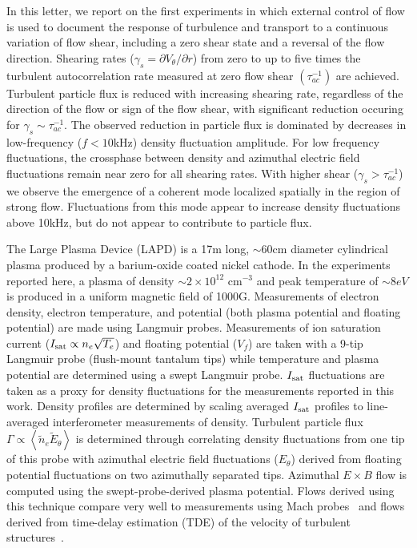 \documentclass[aps,prl,amsmath,amssymb,reprint,superscriptaddress]{revtex4-1} %
\begin{document}
In this letter, we report on the first experiments in which external control of flow is used to document the response of turbulence and transport to a continuous variation of flow shear, including a zero shear state and a reversal of the flow direction. Shearing rates ($\gamma_{s}= \partial V_{\theta}/\partial r$) from
zero to up to five times the turbulent autocorrelation rate measured at zero flow shear $(\tau_{ac}^{-1})$ are achieved. Turbulent particle flux is reduced with increasing shearing rate, regardless of the direction of the flow or sign of the flow shear, with significant reduction occuring for $\gamma_{s} \sim \tau_{ac}^{-1}$.  The observed reduction in particle flux is dominated by decreases in low-frequency ($f < 10$kHz) density fluctuation amplitude. For low frequency fluctuations, the crossphase between density and azimuthal electric field fluctuations remain near zero for all shearing rates.  With higher shear ($\gamma_{s} > \tau_{ac}^{-1}$) we observe the emergence of a coherent mode localized spatially in the region
of strong flow. Fluctuations from this mode appear to increase density fluctuations above 10kHz, but do not appear to contribute to particle flux.   

The Large Plasma Device \cite{gek91} (LAPD) is a 17m long, $\sim 60$cm
diameter cylindrical plasma produced by a barium-oxide coated nickel
cathode. In the experiments reported here, a plasma of density $\sim 2
\times 10^{12}$ cm$^{-3}$ and peak temperature of $\sim 8 eV$ is
produced in a uniform magnetic field of 1000G.  Measurements of 
electron density, electron temperature, and potential (both plasma
potential and floating potential) are made using Langmuir probes.  
Measurements of ion saturation current ($I_{\rm sat} \propto n_e \sqrt{T_e}$) and floating
potential ($V_f$) are taken with a 9-tip Langmuir probe (flush-mount
tantalum tips) while temperature and plasma potential are
determined using a swept Langmuir probe. $I_{\rm sat}$ fluctuations are taken as a proxy for density fluctuations for the measurements reported in this work. Density profiles are determined by scaling averaged $I_{\rm sat}$ profiles to line-averaged interferometer measurements of density.  Turbulent particle flux
$\Gamma \propto \left<\tilde{n}_e \tilde{E}_\theta\right>$ is
determined through correlating density fluctuations from one tip
of this probe with
azimuthal electric field fluctuations ($E_\theta$) derived from
floating potential fluctuations on two azimuthally separated tips.
Azimuthal $E\times B$ flow is computed
using the swept-probe-derived plasma potential.  Flows derived using
this technique compare very well to measurements using
Mach probes~\cite{maggs07} and flows derived from time-delay
estimation (TDE) of the velocity of turbulent structures~\cite{holland04}.
  
\end{document}
